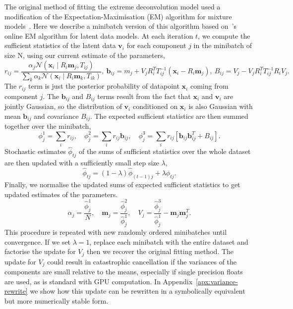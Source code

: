 \documentclass{article}
\newcommand{\bx}{\mathbf{x}}
\newcommand{\bv}{\mathbf{v}}
\newcommand{\bm}{\mathbf{m}}
\newcommand{\bb}{\mathbf{b}}
\begin{document}
The original method of fitting the extreme deconvolution model used a modification of the Expectation-Maximisation (EM) algorithm for mixture models~\cite{dempsterMaximumLikelihoodIncomplete1977}.
Here we describe a minibatch version of this algorithm based on~\citet{cappeOnlineExpectationMaximization2009}'s online EM algorithm for latent data models.
At each iteration $t$, we compute the sufficient statistics of the latent data $\bv_i$ for each component $j$ in the minibatch of size N, using our current estimate of the parameters,
\begin{equation}
r_{ij} = \frac{\alpha_j \mathcal{N}(\bx_i \mid R_i\bm_j, T_{ij})}{\sum_k \alpha_k \mathcal{N}(\bx_i \mid R_i\bm_k, T_{ik})}, \ 
\bb_{ij} = m_j + V_j R_i^T T_{ij}^{-1}(\bx_i - R_i \bm_j), \ 
B_{ij} = V_j - V_j R_i^T T_{ij}^{-1}R_iV_j.
\end{equation}
The $r_{ij}$ term is just the posterior probability of datapoint $\bx_i$ coming from component $j$.
The $\bb_{ij}$ and $B_{ij}$ terms result from the fact that $\bx_i$ and $\bv_i$ are jointly Gaussian, so the distribution of $\bv_i$ conditioned on $\bx_i$ is also Gaussian with mean $\bb_{ij}$ and covariance $B_{ij}$.
The expected sufficient statistics are then summed together over the minibatch,
\begin{equation}
\phi_j^1 = \sum_i r_{ij}, \quad
\phi_j^2 = \sum_i r_{ij} \bb_{ij}, \quad
\phi_j^3 = \sum_i r_{ij} [\bb_{ij}\bb_{ij}^T + B_{ij}].
\end{equation}
Stochastic estimates $\hat{\phi}_{tj} $ of the sums of sufficient statistics over the whole dataset are then updated with a sufficiently small step size $\lambda$,
\begin{equation}
\hat{\phi}_{tj} = (1 - \lambda)\hat{\phi}_{(t-1)j} + \lambda \phi_{tj}.
\end{equation}
Finally, we normalise the updated sums of expected sufficient statistics to get updated estimates of the parameters.
\begin{equation}
\alpha_j = \frac{\hat{\phi}_j^1}{N}, \quad
\bm_j = \frac{\hat{\phi}_j^2}{\hat{\phi}_j^1}, \quad
V_j = \frac{\hat{\phi}_j^3}{\hat{\phi}_j^1} - \bm_j \bm_j^T.
\end{equation}
This procedure is repeated with new randomly ordered minibatches until convergence.
If we set $\lambda=1$, replace each minibatch with the entire dataset and factorise the update for $V_j$ then we recover the original fitting method.
The update for $V_j$ could result in catastrophic cancellation if the variances of the components are small relative to the means, especially if single precision floats are used, as is standard with GPU computation.
In Appendix~\ref{apx:variance-rewrite} we show how this update can be rewritten in a symbolically equivalent but more numerically stable form.
\end{document}
